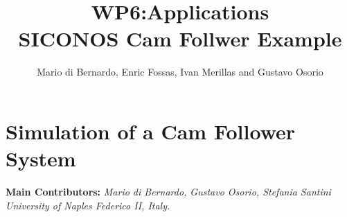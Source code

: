 \documentclass[11pt,a4paper]{report}
\title{{\LARGE \bf WP6:Applications} \\ \vspace{0.2cm }
SICONOS Cam Follwer Example}
\author{Mario di Bernardo, Enric Fossas, Ivan Merillas and Gustavo Osorio}
\begin{document}

\maketitle

\tableofcontents

\newpage


\section{Simulation of a Cam Follower System}
{\bf Main Contributors:} {\textit{Mario di Bernardo, Gustavo Osorio, Stefania Santini}}\\
\textit{University of Naples Federico II, Italy.}\\


\end{document}

